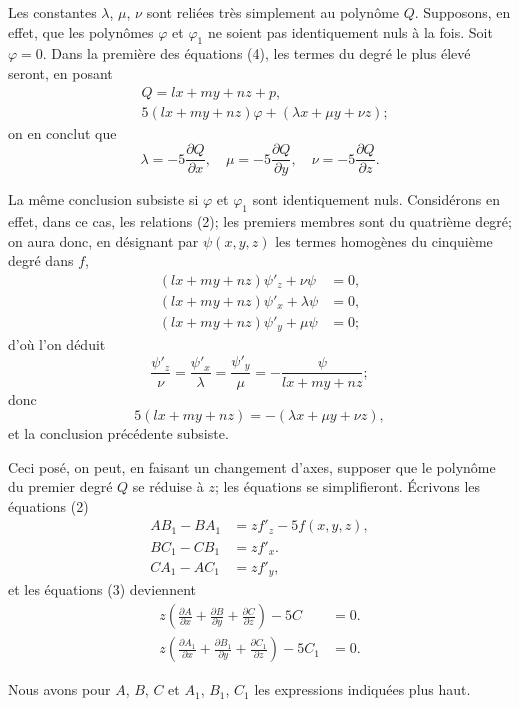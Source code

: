 \documentclass{article}
\begin{document}
Les constantes $\lambda$, $\mu$, $\nu$ sont reliées très simplement au polynôme $Q$. Supposons, en effet, que les polynômes $\varphi$ et $\varphi_{1}$ ne soient pas identiquement nuls à la fois. Soit $\varphi = 0$. Dans la première des équations (4), les termes du degré le plus élevé seront, en posant
\[
\begin{aligned}
&Q = lx + my + nz + p, \\
&5(lx + my + nz)\varphi + (\lambda x + \mu y + \nu z);
\end{aligned}
\]
on en conclut que
\[
\lambda = -5\frac{\partial Q}{\partial x}, \quad \mu = -5\frac{\partial Q}{\partial y}, \quad \nu = -5\frac{\partial Q}{\partial z}.
\]

La même conclusion subsiste si $\varphi$ et $\varphi_{1}$ sont identiquement nuls. Considérons en effet, dans ce cas, les relations (2); les premiers membres sont du quatrième degré; on aura donc, en désignant par $\psi(x, y, z)$ les termes homogènes du cinquième degré dans $f$,
\[
\begin{aligned}
(lx + my + nz)\psi'_{z} + \nu\psi &= 0, \\
(lx + my + nz)\psi'_{x} + \lambda\psi &= 0, \\
(lx + my + nz)\psi'_{y} + \mu\psi &= 0;
\end{aligned}
\]
d'où l'on déduit
\[
\frac{\psi'_{z}}{\nu} = \frac{\psi'_{x}}{\lambda} = \frac{\psi'_{y}}{\mu} = -\frac{\psi}{lx + my + nz};
\]
donc
\[
5(lx + my + nz) = -(\lambda x + \mu y + \nu z),
\]
et la conclusion précédente subsiste.

Ceci posé, on peut, en faisant un changement d'axes, supposer que le polynôme du premier degré $Q$ se réduise à $z$; les équations se simplifieront. Écrivons les équations (2)
\[
\begin{aligned}
AB_{1} - BA_{1} &= zf'_{z} - 5f(x, y, z), \\
BC_{1} - CB_{1} &= zf'_{x}. \\
CA_{1} - AC_{1} &= zf'_{y},
\end{aligned}
\tag{4}
\]
et les équations (3) deviennent
\[
\begin{aligned}
z\left(\frac{\partial A}{\partial x} + \frac{\partial B}{\partial y} + \frac{\partial C}{\partial z}\right) - 5C &= 0. \\
z\left(\frac{\partial A_{1}}{\partial x} + \frac{\partial B_{1}}{\partial y} + \frac{\partial C_{1}}{\partial z}\right) - 5C_{1} &= 0.
\end{aligned}
\]

Nous avons pour $A$, $B$, $C$ et $A_{1}$, $B_{1}$, $C_{1}$ les expressions indiquées plus haut.
\end{document}
